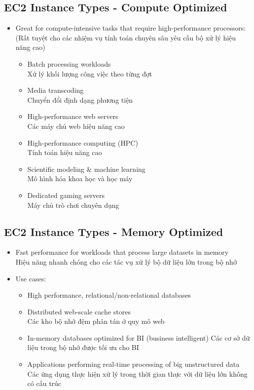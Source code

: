 \subsection{EC2 Instance Types - Compute Optimized}

\begin{itemize}
\item Great for compute-intensive tasks that require high-performance processors: \\ 
(Rất tuyệt cho các nhiệm vụ tính toán chuyên sâu yêu cầu bộ xử lý hiệu năng cao)
\begin{itemize}
	\item Batch processing workloads \\ Xử lý khối lượng công việc theo từng đợt
	\item Media transcoding \\ Chuyển đổi định dạng phương tiện 
	\item High-performance web servers \\ Các máy chủ web hiệu năng cao
	\item High-performance computing (HPC) \\ Tính toán hiệu năng cao
	\item Scientific modeling \& machine learning \\ Mô hình hóa khoa học và học máy
	\item Dedicated gaming servers \\ Máy chủ trò chơi chuyên dụng
\end{itemize}
\end{itemize}

\subsection{EC2 Instance Types - Memory Optimized}

\begin{itemize}
	\item Fast performance for workloads that process large datasets in memory \\
	Hiệu năng nhanh chóng cho các tác vụ xử lý bộ dữ liệu lớn trong bộ nhớ
	\item Use cases:
	\begin{itemize}
		\item High performance, relational/non-relational databases 
		\item Distributed web-scale cache stores \\ Các kho bộ nhớ đệm phân tán ở quy mô web
		\item In-memory databases optimized for BI (business intelligent) Các cơ sở dữ liệu trong bộ nhớ được tối ưu cho BI
		\item Applications performing real-time processing of big unstructured data \\ Các ứng dụng thực hiện xử lý trong thời gian thực với dữ liệu lớn không có cấu trúc
	\end{itemize}
\end{itemize}


